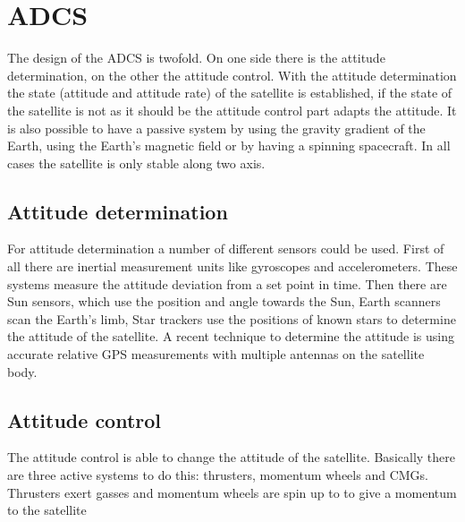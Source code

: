 \section{ADCS}
The design of the \ac{ADCS} is twofold. On one side there is the attitude determination, on the other the attitude control. With the attitude determination the state (attitude and attitude rate) of the satellite is established, if the state of the satellite is not as it should be the attitude control part adapts the attitude. It is also possible to have a passive system by using the gravity gradient of the Earth, using the Earth's magnetic field or by having a spinning spacecraft. In all cases the satellite is only stable along two axis.

\subsection{Attitude determination}
For attitude determination a number of different sensors could be used. First of all there are inertial measurement units like gyroscopes and accelerometers. These systems measure the attitude deviation from a set point in time. Then there are Sun sensors, which use the position and angle towards the Sun,  Earth scanners scan the Earth's limb, Star trackers use the positions of known stars to determine the attitude of the satellite. A recent technique to determine the attitude is using accurate relative \ac{GPS} measurements with multiple antennas on the satellite body.

\subsection{Attitude control}
The attitude control is able to change the attitude of the satellite. Basically there are three active systems to do this: thrusters, momentum wheels and \ac{CMG}s. Thrusters exert gasses and momentum wheels are spin up to to give a momentum to the satellite